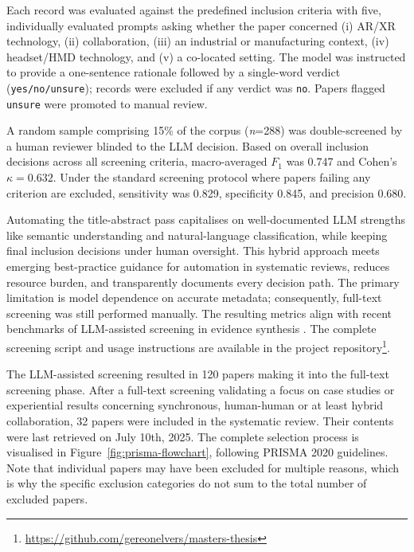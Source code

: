 Each record was evaluated against the predefined inclusion criteria with five, individually evaluated prompts asking whether the paper concerned (i) AR/XR technology, (ii) collaboration, (iii) an industrial or manufacturing context, (iv) headset/HMD technology, and (v) a co-located setting. The model was instructed to provide a one-sentence rationale followed by a single-word verdict (\texttt{yes/no/unsure}); records were excluded if any verdict was \texttt{no}. Papers flagged \texttt{unsure} were promoted to manual review.

A random sample comprising 15\% of the corpus (\emph{n}=288) was double-screened by a human reviewer blinded to the LLM decision. Based on overall inclusion decisions across all screening criteria, macro-averaged \(F_{1}\) was 0.747 and Cohen's \(\kappa = 0.632\). Under the standard screening protocol where papers failing any criterion are excluded, sensitivity was 0.829, specificity 0.845, and precision 0.680.

Automating the title-abstract pass capitalises on well-documented LLM strengths like semantic understanding and natural-language classification, while keeping final inclusion decisions under human oversight. This hybrid approach meets emerging best-practice guidance for automation in systematic reviews, reduces resource burden, and transparently documents every decision path. The primary limitation is model dependence on accurate metadata; consequently, full-text screening was still performed manually. The resulting metrics align with recent benchmarks of LLM-assisted screening in evidence synthesis \cite{dennstadt2024title,oami2024performance}. The complete screening script and usage instructions are available in the project repository\footnote{\url{https://github.com/gereonelvers/masters-thesis}}.


The LLM-assisted screening resulted in 120 papers making it into the full-text screening phase. After a full-text screening validating a focus on case studies or experiential results concerning synchronous, human-human or at least hybrid collaboration, 32 papers were included in the systematic review. Their contents were last retrieved on July 10th, 2025. The complete selection process is visualised in Figure~\ref{fig:prisma-flowchart}, following PRISMA 2020 guidelines\cite{Haddaway2022PRISMA2020}. Note that individual papers may have been excluded for multiple reasons, which is why the specific exclusion categories do not sum to the total number of excluded papers.

